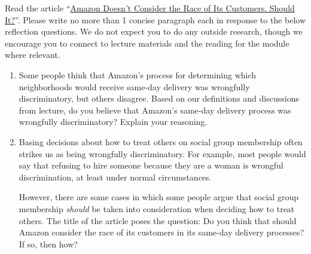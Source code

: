 \documentclass[submit]{harvardml}
\begin{document}
\newpage

\begin{problem}

Read the article ``\href{https://www.bloomberg.com/graphics/2016-amazon-same-day/}{Amazon Doesn’t Consider the Race of Its Customers. Should It?}''. Please write no more than 1 concise paragraph each in response to the below reflection questions.  We do not expect you to do any outside research, though we encourage you to connect to lecture materials and the reading for the module where relevant.



\begin{enumerate}
    \item Some people think that Amazon’s process for determining which neighborhoods would receive same-day delivery was wrongfully discriminatory, but others disagree.  Based on our definitions and discussions from lecture, do you believe that Amazon's same-day delivery process was wrongfully discriminatory? Explain your reasoning.
    
    
    \item Basing decisions about how to treat others on social group membership often strikes us as being wrongfully discriminatory. For example, most people would say that refusing to hire someone because they are a woman is wrongful discrimination, at least under normal circumstances.
    
    However, there are some cases in which some people argue that social group membership \emph{should} be taken into consideration when deciding how to treat others.  The title of the article poses the question: Do you think that should Amazon consider the race of its customers in its same-day delivery processes? If so, then how? 
    
    

\end{enumerate}
\end{problem}
\end{document}
